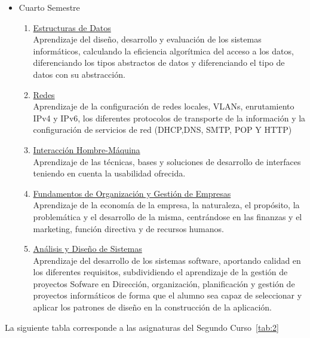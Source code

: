 \begin{itemize}
\item Cuarto Semestre
\begin{enumerate}[resume]
\item \underline{Estructuras de Datos}\\Aprendizaje del diseño, desarrollo y evaluación de los sistemas informáticos, calculando la eficiencia algorítmica del acceso a los datos, diferenciando los tipos abstractos de datos y diferenciando el tipo de datos con su abstracción. 
\item \underline{Redes}\\Aprendizaje de la configuración de redes locales, VLANs, enrutamiento IPv4 y IPv6, los diferentes protocolos de transporte de la información y la configuración de servicios de red (DHCP,DNS, SMTP, POP Y HTTP)
\item \underline{Interacción Hombre-Máquina}\\Aprendizaje de las técnicas, bases y soluciones de desarrollo de interfaces teniendo en cuenta la usabilidad ofrecida. 
\item \underline{Fundamentos de Organización y Gestión de Empresas}\\Aprendizaje de la economía de la empresa, la naturaleza, el propósito, la problemática y el desarrollo de la misma, centrándose en las finanzas y el marketing, función directiva y de recursos humanos. 
\item \underline{Análisis y Diseño de Sistemas}\\Aprendizaje del desarrollo de los sistemas software, aportando calidad en los diferentes requisitos, subdividiendo el aprendizaje de la gestión de proyectos Sofware en Dirección, organización, planificación y gestión de proyectos informáticos  de forma que el alumno sea capaz de seleccionar y aplicar los patrones de diseño en la construcción de la aplicación.
\end{enumerate}

\end{itemize}
La siguiente tabla corresponde a las asignaturas del Segundo Curso~\ref{tab:2}
